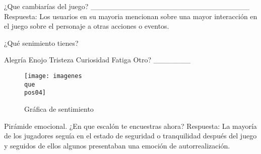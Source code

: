 \begin{questions}
	\question ¿Que cambiarías del juego?
	______________________________
	Respuesta: Los usuarios en su mayoria mencionan sobre una mayor interacción en el juego sobre el personaje a otras acciones o eventos. 
	

	\question ¿Qué senimiento tienes? 
	\begin{checkboxes}
		\choice Alegría
		\choice Enojo
		\choice Tristeza
		\choice Curiosidad
		\choice Fatiga
		\choice Otro? _______
	\end{checkboxes}

\begin{figure}
	\centering
	\caption{Gráfica de sentimiento}
	\label{fig:pos04}
	\texttt{[image: imagenes\\que\\pos04]}
\end{figure}



	\question Pirámide emocional. ¿En que escalón te encuestras ahora?
	Respuesta: La mayoría de los jugadores seguía en el estado de seguridad o tranquilidad después del juego y seguidos de ellos algunos presentaban una emoción de autorrealización.


\end{questions}

